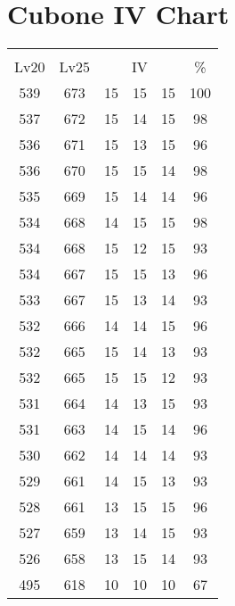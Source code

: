 \documentclass{article}%
\begin{document}
%
\normalsize%
\section{Cubone IV Chart}%
\label{sec:Cubone IV Chart}%
\renewcommand{\arraystretch}{1.5}%
\begin{tabular}{|c|c|c|c|c|c|}%
\hline%
\multicolumn{6}{|c|}{\textcolor{white}{ 
\linebreak{Cubone}
}%
\cellcolor{black}}\\%
\multicolumn{1}{|c}{Lv20}&\multicolumn{1}{c|}{Lv25}&\multicolumn{3}{c|}{IV}&\multicolumn{1}{|c|}{\%}\\%
\hline%
\rowcolor{color100}%
539&673&15&15&15&100\\%
\hline%
\rowcolor{color98}%
537&672&15&14&15&98\\%
\hline%
\rowcolor{color96}%
536&671&15&13&15&96\\%
\hline%
\rowcolor{color98}%
536&670&15&15&14&98\\%
\hline%
\rowcolor{color96}%
535&669&15&14&14&96\\%
\hline%
\rowcolor{color98}%
534&668&14&15&15&98\\%
\hline%
\rowcolor{color93}%
534&668&15&12&15&93\\%
\hline%
\rowcolor{color96}%
534&667&15&15&13&96\\%
\hline%
\rowcolor{color93}%
533&667&15&13&14&93\\%
\hline%
\rowcolor{color96}%
532&666&14&14&15&96\\%
\hline%
\rowcolor{color93}%
532&665&15&14&13&93\\%
\hline%
\rowcolor{color93}%
532&665&15&15&12&93\\%
\hline%
\rowcolor{color93}%
531&664&14&13&15&93\\%
\hline%
\rowcolor{color96}%
531&663&14&15&14&96\\%
\hline%
\rowcolor{color93}%
530&662&14&14&14&93\\%
\hline%
\rowcolor{color93}%
529&661&14&15&13&93\\%
\hline%
\rowcolor{color96}%
528&661&13&15&15&96\\%
\hline%
\rowcolor{color93}%
527&659&13&14&15&93\\%
\hline%
\rowcolor{color93}%
526&658&13&15&14&93\\%
\hline%
\rowcolor{color91}%
495&618&10&10&10&67\\%
\end{tabular}

%
\end{document}
